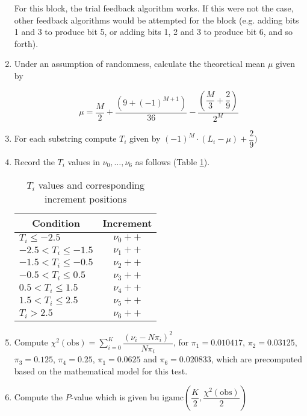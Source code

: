 \begin{enumerate}
    For this block, the trial feedback algorithm works. If this were not the case, other feedback algorithms would be attempted for the block (e.g. adding bits 1 and 3 to produce bit 5, or adding bits 1, 2 and 3 to produce bit 6, and so forth).
    
    \item Under an assumption of randomness, calculate the theoretical mean $\mu$ given by
    
    \[
        \mu=\dfrac{M}{2}+\dfrac{(9+(-1)^{M+1})}{36}-\dfrac{(\dfrac{M}{3}+\dfrac{2}{9})}{2^M}
    \]
    
    \item For each substring compute $T_i$ given by $(-1)^M\cdot(L_i-\mu)+\dfrac{2}{9})$
    
    \item Record the $T_i$ values in $\nu_0,\ldots,\nu_6$ as follows (Table \ref{tab:lct_s3}).
    
    \begin{table}[h!]
        \centering
        \begin{tabular}{|l|c|}
            \hline
            \multicolumn{1}{|c|}{\textbf{Condition}} & \textbf{Increment} \\ \hline
            $T_i\leq-2.5$ & $\nu_0++$ \\ \hline
            $-2.5<T_i\leq-1.5$ & $\nu_1++$ \\ \hline
            $-1.5<T_i\leq-0.5$ & $\nu_2++$ \\ \hline
            $-0.5<T_i\leq0.5$ & $\nu_3++$ \\ \hline
            $0.5<T_i\leq1.5$ & $\nu_4++$ \\ \hline
            $1.5<T_i\leq2.5$ & $\nu_5++$ \\ \hline
            $T_i>2.5$ & $\nu_6++$ \\ \hline
        \end{tabular}
        \caption{$T_i$ values and corresponding increment positions}
        \label{tab:lct_s3}
    \end{table}
    
    \item Compute $\chi^2(\text{obs}) = \sum_{i=0}^{K}\dfrac{(\nu_i-N\pi_i)^2}{N\pi_i}$, for $\pi_1=0.010417$, $\pi_2=0.03125$, $\pi_3=0.125$, $\pi_4=0.25$, $\pi_1=0.0625$ and $\pi_6=0.020833$, which are precomputed based on the mathematical model for this test.
    
    \item Compute the $P$-value which is given bu $\text{igamc}(\dfrac{K}{2}, \dfrac{\chi^2(\text{obs})}{2})$
\end{enumerate}

